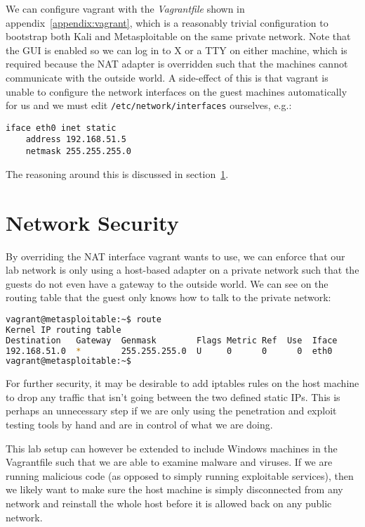 \documentclass{report}
\begin{document}
We can configure vagrant with the \emph{Vagrantfile} shown in appendix~\ref{appendix:vagrant},
which is a reasonably trivial configuration to bootstrap both Kali and Metasploitable on
the same private network. Note that the GUI is enabled so we can log in to X or a TTY
on either machine, which is required because the NAT adapter is overridden such that the
machines cannot communicate with the outside world. A side-effect of this is that
vagrant is unable to configure the network interfaces on the guest machines automatically
for us and we must edit \texttt{/etc/network/interfaces} ourselves, e.g.:

\begin{lstlisting}
iface eth0 inet static
    address 192.168.51.5
    netmask 255.255.255.0
\end{lstlisting}

The reasoning around this is discussed in section~\ref{sec:netsec}.

\section{Network Security}
\label{sec:netsec}

By overriding the NAT interface vagrant wants to use, we can enforce that
our lab network is only using a host-based adapter on a private network such
that the guests do not even have a gateway to the outside world. We can see
on the routing table that the guest only knows how to talk to the private
network:

\begin{lstlisting}[language=bash]
vagrant@metasploitable:~$ route
Kernel IP routing table
Destination   Gateway  Genmask        Flags Metric Ref  Use  Iface
192.168.51.0  *        255.255.255.0  U     0      0      0  eth0
vagrant@metasploitable:~$
\end{lstlisting}

For further security, it may be desirable to add iptables rules on the host
machine to drop any traffic that isn't going between the two defined
static IPs. This is perhaps an unnecessary step if we are only using the
penetration and exploit testing tools by hand and are in control of what
we are doing.

This lab setup can however be extended to include Windows
machines in the Vagrantfile such that we are able to examine malware and
viruses. If we are running malicious code (as opposed to simply running
exploitable services), then we likely want to make sure the host machine
is simply disconnected from any network and reinstall the whole host
before it is allowed back on any public network.
\end{document}
